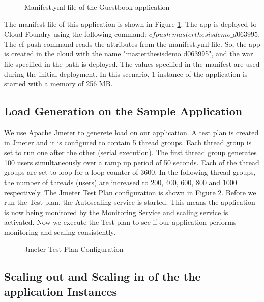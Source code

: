 \documentclass[article,type=msc,colorback,12pt,accentcolor=tud8b,table]{tudthesis}
\begin{document}
 \begin{figure}
 \begin{center}
  \makebox[\textwidth]{\texttt{[image: E2]}}
\end{center}
\caption{Manifest.yml file of the Guestbook application}
\label{fig:guestbook_manifest}
\end{figure}
The manifest file of this application is shown in Figure \ref{fig:guestbook_manifest}. The app is deployed to Cloud Foundry using the following command: $ cf push \: masterthesisdemo\_d063995 $. The cf push command reads the attributes from the manifest.yml file. So, the app is created in the cloud with the name "masterthesisdemo$\_$d063995", and the war file specified in the path is deployed. The values specified in the manifest are used during the initial deployment. In this scenario, 1 instance of the application is started with a memory of 256 MB.	
	\subsection{Load Generation on the Sample Application}
	
 We use Apache Jmeter to generete load on our application. A test plan is created in Jmeter and it is configured to contain 5 thread groups. Each thread group is set to run one after the other (serial execution). The first thread group generates 100 users simultaneously over a ramp up period of 50 seconds. Each of the thread groups are set to loop for a loop counter of 3600. In the following thread groups, the number of threads (users) are increased to 200, 400, 600, 800 and 1000 respectively. The Jmeter Test Plan configuration is shown in Figure \ref{fig:jmeter_testplan}. Before we run the Test plan, the Autoscaling service is started. This means the application is now being monitored by the Monitoring Service and scaling service is activated. Now we execute the Test plan to see if our application performs monitoring and scaling consistently.
 
  \begin{figure}[h]
  	\begin{center}
  		\makebox[\textwidth]{\texttt{[image: E3]}}
  	\end{center}
  	\caption{Jmeter Test Plan Configuration}
  	\label{fig:jmeter_testplan}
  \end{figure}
	
	\subsection{Scaling out and Scaling in of the the application Instances}
		
\end{document}
